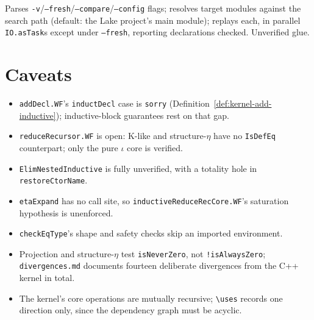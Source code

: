 \begin{definition}
\label{def:kernel-main}
\leanok
{}
 Parses \texttt{-v}/\texttt{--fresh}/\texttt{--compare}/\texttt{--config} flags;
resolves target modules against the search path (default: the Lake project's main module); replays
each, in parallel \texttt{IO.asTask}s except under \texttt{--fresh}, reporting declarations
checked. Unverified glue.
\end{definition}

\section*{Caveats}

\begin{itemize}
\item \texttt{addDecl.WF}'s \texttt{inductDecl} case is \texttt{sorry}
(Definition~\ref{def:kernel-add-inductive}); inductive-block guarantees rest on that gap.
\item \texttt{reduceRecursor.WF} is open: K-like and structure-$\eta$ have no \texttt{IsDefEq}
counterpart; only the pure $\iota$ core is verified.
\item \texttt{ElimNestedInductive} is fully unverified, with a totality hole in
\texttt{restoreCtorName}.
\item \texttt{etaExpand} has no call site, so \texttt{inductiveReduceRecCore.WF}'s saturation
hypothesis is unenforced.
\item \texttt{checkEqType}'s shape and safety checks skip an imported environment.
\item Projection and structure-$\eta$ test \texttt{isNeverZero}, not \texttt{!isAlwaysZero};
\texttt{divergences.md} documents fourteen deliberate divergences from the C++ kernel in total.
\item The kernel's core operations are mutually recursive; \texttt{\textbackslash uses} records one direction
only, since the dependency graph must be acyclic.
\end{itemize}
